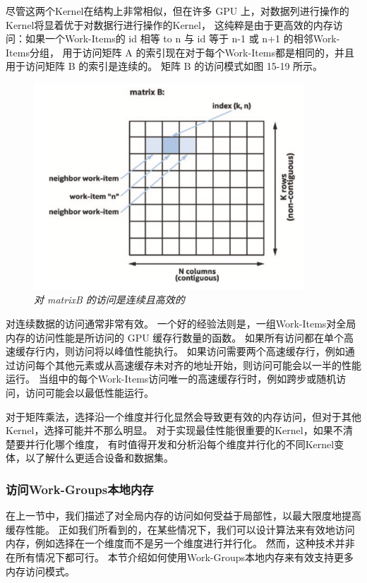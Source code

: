 尽管这两个Kernel在结构上非常相似，但在许多 GPU 上，对数据列进行操作的Kernel将显着优于对数据行进行操作的Kernel，
这纯粹是由于更高效的内存访问：如果一个Work-Items的 id 相等 to n 与 id 等于 n-1 或 n+1 的相邻Work-Items分组，
用于访问矩阵 A 的索引现在对于每个Work-Items都是相同的，并且用于访问矩阵 B 的索引是连续的。 
矩阵 B 的访问模式如图 15-19 所示。

\begin{figure}[H]
	\centering
	\includegraphics[width=0.9\textwidth]{figs/F15.19.png}
	\caption{\textit{对 matrixB 的访问是连续且高效的}}
\end{figure}

对连续数据的访问通常非常有效。 一个好的经验法则是，一组Work-Items对全局内存的访问性能是所访问的 GPU 缓存行数量的函数。 
如果所有访问都在单个高速缓存行内，则访问将以峰值性能执行。 
如果访问需要两个高速缓存行，例如通过访问每个其他元素或从高速缓存未对齐的地址开始，则访问可能会以一半的性能运行。 
当组中的每个Work-Items访问唯一的高速缓存行时，例如跨步或随机访问，访问可能会以最低性能运行。

\begin{remark}[分析Kernel变体]
对于矩阵乘法，选择沿一个维度并行化显然会导致更有效的内存访问，但对于其他Kernel，选择可能并不那么明显。
对于实现最佳性能很重要的Kernel，如果不清楚要并行化哪个维度，
有时值得开发和分析沿每个维度并行化的不同Kernel变体，以了解什么更适合设备和数据集。
\end{remark}

\subsubsection{访问Work-Groups本地内存}
在上一节中，我们描述了对全局内存的访问如何受益于局部性，以最大限度地提高缓存性能。 
正如我们所看到的，在某些情况下，我们可以设计算法来有效地访问内存，例如选择在一个维度而不是另一个维度进行并行化。 
然而，这种技术并非在所有情况下都可行。 本节介绍如何使用Work-Groups本地内存来有效支持更多内存访问模式。

